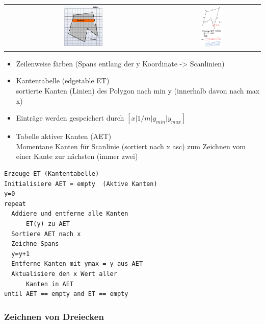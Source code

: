 \begin{tabular}{cc}
  \includegraphics[width=0.25\textwidth]{assets/scanlinien-alg.png} &
  \includegraphics[width=0.25\textwidth]{assets/scanlinien-alg-demo.png} \\
\end{tabular}

\begin{itemize}
	\item Zeilenweise färben (Spans entlang der y Koordinate -> Scanlinien)
	\item Kantentabelle (edgetable ET)\\
    sortierte Kanten (Linien) des Polygon nach min y (innerhalb davon nach max x)
  \item Einträge werden gespeichert durch $[x|1/m|y_{min}|y_{max}]$
	\item Tabelle aktiver Kanten (AET)\\
		Momentane Kanten für Scanlinie (sortiert nach x asc) zum Zeichnen vom einer Kante zur nächsten (immer zwei)
\end{itemize}

\begin{lstlisting}
Erzeuge ET (Kantentabelle)
Initialisiere AET = empty  (Aktive Kanten)
y=0
repeat
  Addiere und entferne alle Kanten
      ET(y) zu AET
  Sortiere AET nach x
  Zeichne Spans
  y=y+1
  Entferne Kanten mit ymax = y aus AET
  Aktualisiere den x Wert aller
      Kanten in AET
until AET == empty and ET == empty
\end{lstlisting}

\subsubsection{Zeichnen von Dreiecken}

